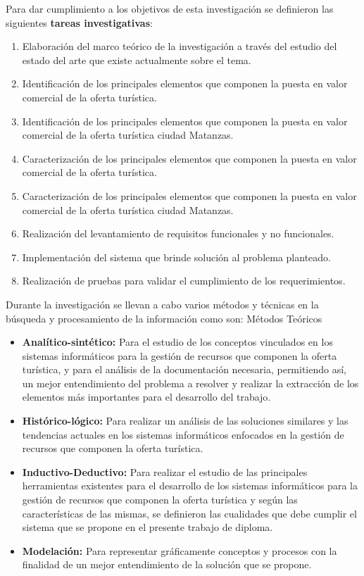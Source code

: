 Para dar cumplimiento a los objetivos de esta investigación se definieron las siguientes \textbf{tareas investigativas}:

\begin{enumerate}
	\item Elaboración del marco teórico de la investigación a través del estudio del estado del arte que existe actualmente sobre el tema. 
	\item Identificación de los principales elementos que componen la puesta en valor comercial de la oferta turística.
	\item Identificación de los principales elementos que componen la puesta en valor comercial de la oferta turística ciudad Matanzas.
	\item Caracterización de los principales elementos que componen la puesta en valor comercial de la oferta turística.
	\item Caracterización de los principales elementos que componen la puesta en valor comercial de la oferta turística ciudad Matanzas.
	\item Realización del levantamiento de requisitos funcionales y no funcionales.
	\item Implementación del sistema que brinde solución al problema planteado.
	\item Realización de pruebas para validar el cumplimiento de los requerimientos.
\end{enumerate}

Durante la investigación se llevan a cabo varios métodos y técnicas en la búsqueda y procesamiento de la información como son:
Métodos Teóricos

\begin{itemize}
	\item \textbf{Analítico-sintético:} Para el estudio de los conceptos vinculados en los sistemas informáticos para la gestión de recursos que componen la oferta turística, y para el análisis de la documentación necesaria, permitiendo así, un mejor entendimiento del problema a resolver y realizar la extracción de los elementos más importantes para el desarrollo del trabajo.
	
	\item \textbf{Histórico-lógico:} Para realizar un análisis de las soluciones similares y las tendencias actuales en los sistemas informáticos enfocados en la gestión de recursos que componen la oferta turística.
	
	\item \textbf{Inductivo-Deductivo:} Para realizar el estudio de las principales herramientas existentes para el desarrollo de los sistemas informáticos para la gestión de recursos que componen la oferta turística y según las características de las mismas, se definieron las cualidades que debe cumplir el sistema que se propone en el presente trabajo de diploma. 
	
	\item \textbf{Modelación:} Para representar gráficamente conceptos y procesos con la finalidad de un mejor entendimiento de la solución que se propone.  
\end{itemize}

